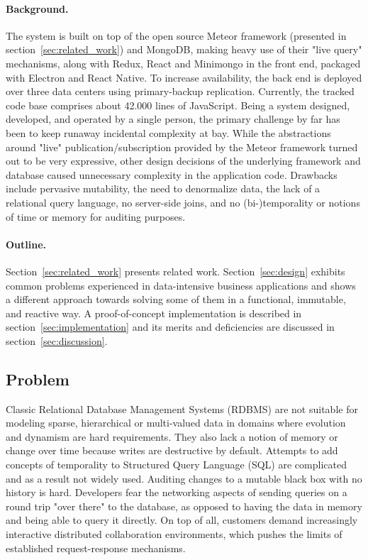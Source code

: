 \cleardoublepage

\paragraph{Background.} The system is built on top of the open source Meteor framework (presented in section~\ref{sec:related_work}) and MongoDB, making heavy use of their "live query" mechanisms, along with Redux, React and Minimongo in the front end, packaged with Electron and React Native. To increase availability, the back end is deployed over three data centers using primary-backup replication. Currently, the tracked code base comprises about 42.000 lines of JavaScript. Being a system designed, developed, and operated by a single person, the primary challenge by far has been to keep runaway incidental complexity at bay. While the abstractions around "live" publication/subscription provided by the Meteor framework turned out to be very expressive, other design decisions of the underlying framework and database caused unnecessary complexity in the application code. Drawbacks include pervasive mutability, the need to denormalize data, the lack of a relational query language, no server-side joins, and no (bi-)temporality or notions of time or memory for auditing purposes.


\paragraph{Outline.} Section~\ref{sec:related_work} presents related work. Section~\ref{sec:design} exhibits common problems experienced in data-intensive business applications and shows a different approach towards solving some of them in a functional, immutable, and reactive way. A proof-of-concept implementation is described in section~\ref{sec:implementation} and its merits and deficiencies are discussed in section~\ref{sec:discussion}.

\cleardoublepage

\subsection{Problem}
Classic Relational Database Management Systems (RDBMS) are not suitable for modeling sparse, hierarchical or multi-valued data in domains where evolution and dynamism are hard requirements. They also lack a notion of memory or change over time because writes are destructive by default. Attempts to add concepts of temporality to Structured Query Language (SQL) are complicated and as a result not widely used. Auditing changes to a mutable black box with no history is hard. Developers fear the networking aspects of sending queries on a round trip "over there" \cite{hickey2012dbvalue} to the database, as opposed to having the data in memory and being able to query it directly. On top of all, customers demand increasingly interactive distributed collaboration environments, which pushes the limits of established request-response mechanisms.

